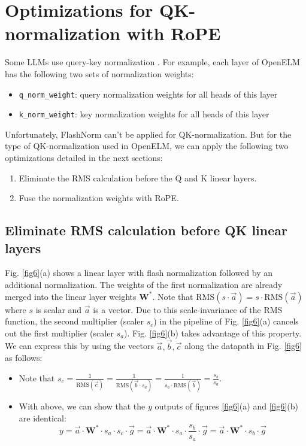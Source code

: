 \documentclass{article}
\numberwithin{equation}{section} %
\newcommand{\mat}[1]{\mathbf{#1}}     %
\newcommand{\RMS}[1]{\text{RMS}(#1)}  %
\def\rms{\text{RMS}(\vec{a})}         %
\def\W*{\mat{W}^\ast}                 %
\def\a{\vec{a}}                       %
\def\b{\vec{b}}                       %
\def\c{\vec{c}}                       %
\def\vg{\vec{g}}                      %
\begin{document}
\section{Optimizations for QK-normalization with RoPE}
Some LLMs use query-key normalization \citep{QKnorm}. For example, each layer of OpenELM \citep{openelm} has the following two sets of normalization weights:
\begin{itemize}[topsep=-1pt, itemsep=-1pt]
  \item \verb+q_norm_weight+: query normalization weights for all heads of this layer
  \item \verb+k_norm_weight+: key normalization weights for all heads of this layer
\end{itemize}
Unfortunately, FlashNorm can't be applied for QK-normalization. But for the type of QK-normalization used in OpenELM, we can apply the following two optimizations detailed in the next sections:
\begin{enumerate}[topsep=-1pt, itemsep=-1pt]
  \item Eliminate the RMS calculation before the Q and K linear layers.
  \item Fuse the normalization weights with RoPE.
\end{enumerate}

\subsection{Eliminate RMS calculation before QK linear layers}
Fig. \ref{fig6}(a) shows a linear layer with flash normalization followed by an additional normalization. The weights of the first normalization are already merged into the linear layer weights $\W*$. Note that $\RMS{s \cdot \a} = s \cdot \rms$ where $s$ is scalar and $\a$ is a vector. Due to this scale-invariance of the RMS function, the second multiplier (scaler $s_c$) in the pipeline of Fig. \ref{fig6}(a) cancels out the first multiplier (scaler $s_a$). Fig. \ref{fig6}(b) takes advantage of this property. We can express this by using the vectors $\a, \b, \c$ along the datapath in Fig. \ref{fig6} as follows:
\begin{itemize}[topsep=-1pt, itemsep=-1pt]
  \item Note that $s_c = \frac{1}{\RMS{\c}} = \frac{1}{\RMS{\b \cdot s_a}} = \frac{1}{s_a \cdot \RMS{\b}} = \frac{s_b}{s_a}$.
  \item With above, we can show that the $y$ outputs of figures \ref{fig6}(a) and \ref{fig6}(b) are identical:
    \begin{equation*}
      y = \a \cdot \W* \cdot s_a \cdot s_c \cdot \vg = \a \cdot \W* \cdot s_a \cdot \frac{s_b}{s_a} \cdot \vg
      = \a \cdot \W* \cdot s_b \cdot \vg
    \end{equation*}
\end{itemize}
\end{document}
